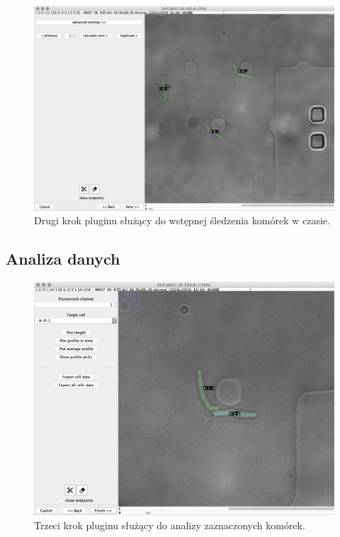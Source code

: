 \documentclass[declaration,shortabstract,mgr]{iithesis}
\begin{document}
\begin{figure}
  \centering
  \includegraphics[width=\textwidth]{images/ui-step-tracker.png}
  \caption{Drugi krok pluginu służący do wstępnej śledzenia komórek w czasie.}
  \label{fig:ui-step-tracker}
\end{figure}

\subsection{Analiza danych}

\begin{figure}
  \centering
  \includegraphics[width=\textwidth]{images/ui-step-measurements.png}
  \caption{Trzeci krok pluginu służący do analizy zaznaczonych komórek.}
  \label{fig:ui-step-measurements}
\end{figure}
\end{document}
